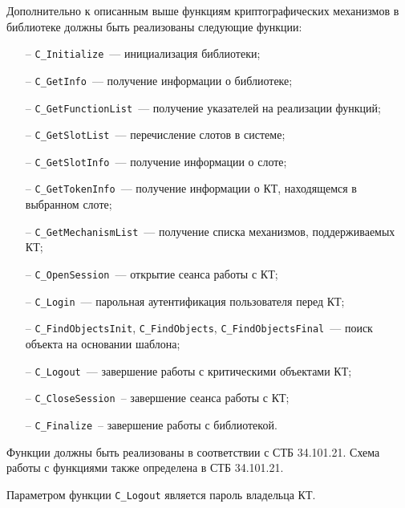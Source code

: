 Дополнительно к описанным выше функциям криптографических механизмов 
в библиотеке должны быть реализованы следующие функции:
\begin{itemize}
\item[--]
\verb|C_Initialize|~--- инициализация библиотеки;
\item[--] 
\verb|C_GetInfo|~--- получение информации о библиотеке;
\item[--] 
\verb|C_GetFunctionList|~--- получение указателей на реализации функций;
\item[--]
\verb|C_GetSlotList|~--- перечисление слотов в системе;
\item[--]
\verb|C_GetSlotInfo|~--- получение информации о слоте;
\item[--]
\verb|C_GetTokenInfo|~--- получение информации о КТ, находящемся в 
выбранном слоте;
\item[--]
\verb|C_GetMechanismList|~--- 
получение списка механизмов, поддерживаемых КТ;
\item[--]
\verb|C_OpenSession|~--- открытие сеанса работы с КТ;
\item[--]
\verb|C_Login|~--- парольная аутентификация пользователя перед КТ;
\item[--]
\verb|C_FindObjectsInit|, \verb|C_FindObjects|, 
\verb|C_FindObjectsFinal|~---
поиск объекта на основании шаблона;
\item[--]
\verb|C_Logout|~--- завершение работы с критическими объектами КТ;
\item[--]
\verb|C_CloseSession|~-- завершение сеанса работы с КТ;
\item[--]
\verb|C_Finalize|~-- завершение работы с библиотекой.
\end{itemize}

Функции должны быть реализованы в соответствии с СТБ 34.101.21.
Схема работы с функциями также определена в СТБ 34.101.21.

Параметром функции \verb|C_Logout| является пароль владельца КТ.



